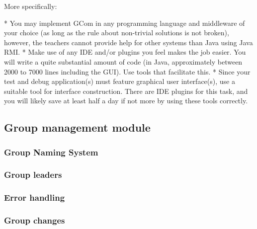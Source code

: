\documentclass[titlepage, twocolumn, a4paper, 10pt]{article}
\begin{document}
More specifically:

* You may implement GCom in any programming language and middleware of your choice (as long as the rule about non-trivial solutions is not broken), however, the teachers cannot provide help for other systems than Java using Java RMI.
* Make use of any IDE and/or plugins you feel makes the job easier. You will write a quite substantial amount of code (in Java, approximately between 2000 to 7000 lines including the GUI). Use tools that facilitate this.
* Since your test and debug application(s) must feature graphical user interface(s), use a suitable tool for interface construction. There are IDE plugins for this task, and you will likely save at least half a day if not more by using these tools correctly.


\subsection{Group management module}\label{sec:group-management-module}

\subsubsection{Group Naming System}\label{sec:group-naming-system}

\subsubsection{Group leaders}\label{sec:group-leaders}

\subsubsection{Error handling}\label{sec:error-handling}

\subsubsection{Group changes}\label{sec:group-changes}
\end{document}
